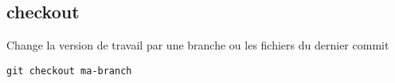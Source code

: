 \subsection*{checkout}
Change la version de travail par une branche ou les fichiers du dernier commit
\begin{verbatim}
git checkout ma-branch
\end{verbatim}

